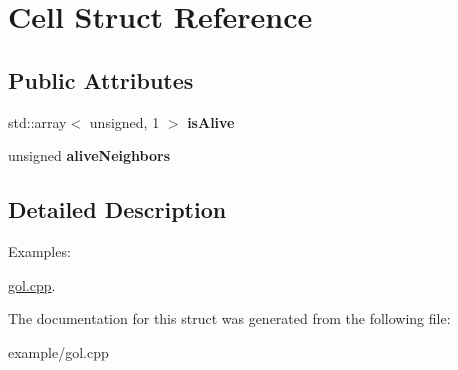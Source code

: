 \hypertarget{structCell}{}\section{Cell Struct Reference}
\label{structCell}
\subsection*{Public Attributes}
\begin{DoxyCompactItemize}
\item 
\hypertarget{structCell_a3461076cfcfad41ea5e5474236afbf3b}{}std\+::array$<$ unsigned, 1 $>$ {\bfseries is\+Alive}\label{structCell_a3461076cfcfad41ea5e5474236afbf3b}

\item 
\hypertarget{structCell_af9f8af059f6a481813e429bc01515076}{}unsigned {\bfseries alive\+Neighbors}\label{structCell_af9f8af059f6a481813e429bc01515076}

\end{DoxyCompactItemize}


\subsection{Detailed Description}
\begin{Desc}
\item[Examples\+: ]\par
\hyperlink{gol_8cpp-example}{gol.\+cpp}.\end{Desc}


The documentation for this struct was generated from the following file\+:\begin{DoxyCompactItemize}
\item 
example/gol.\+cpp\end{DoxyCompactItemize}
